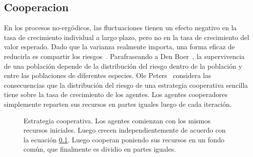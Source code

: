 \documentclass[a4paper,10pt]{article}
\begin{document}
\subsection{Cooperacion}

En los procesos no-ergódicos, las fluctuaciones tienen un efecto negativo en la tasa de crecimiento individual a largo plazo, pero no en la tasa de crecimiento del valor esperado.
Dado que la varianza realmente importa, una forma eficaz de reducirla es compartir los riesgos~\cite{yaari2010-cooperationEvolution, peters2015-evolutionaryAdvantageOfCooperation}.
Parafraseando a Den Boer~\cite{denBoer1968-spreadingRisk}, la  supervivencia de una población depende de la distribución del riesgo dentro de la población y entre las poblaciones de diferentes especies.
Ole Peters~\cite{peters2015-evolutionaryAdvantageOfCooperation} considera las consecuencias que la distribución del riesgo de una estrategia cooperativa sencilla tiene sobre la tasa de crecimiento de los agentes.
Los agentes cooperadores simplemente reparten sus recursos en partes iguales luego de cada iteración.

\begin{figure}[H]
\centering
{}
\caption{Estrategia cooperativa. Los agentes comienzan con los mismos recursos iniciales. Luego crecen independientemente de acuerdo con la ecuaci\'on \ref{}. Luego cooperan poniendo sus recursos en un fondo común, que finalmente es dividio en partes iguales.}
\label{fig:protocolo}
\end{figure}
\end{document}
